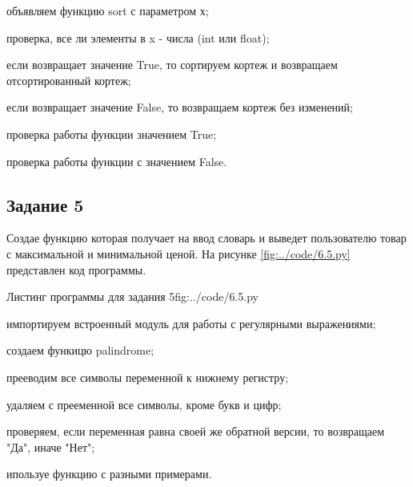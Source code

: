 \documentclass{vvsu}
\begin{document}
\begin{vvsu_list}
  \item объявляем функцию sort с параметром х;
  \item проверка, все ли элементы в x - числа (int или float);
  \item если возвращает значение True, то сортируем кортеж и возвращаем отсортированный кортеж;
  \item если возвращает значение False, то возвращаем кортеж без изменений;
  \item проверка работы функции значением True;
  \item проверка работы функции с значением False.
\end{vvsu_list}

\subsection{Задание 5}
  Создае функцию которая получает на ввод словарь и выведет пользователю товар с максимальной и минимальной ценой. На рисунке  \ref{fig:../code/6.5.py} представлен код программы.

\begin{vvsu_figure}{Листинг программы для задания 5}{fig:../code/6.5.py}
  \begin{minipage}{.75\textwidth}
    
  \end{minipage}
\end{vvsu_figure}

\begin{vvsu_list}
  \item импортируем встроенный модуль для работы с регулярными выражениями;
  \item создаем функицю palindrome;
  \item прееводим все символы переменной к нижнему регистру;
  \item удаляем с прееменной все символы, кроме букв и цифр;
  \item проверяем, если переменная равна своей же обратной версии, то возвращаем "Да", иначе "Нет";
  \item ипользуе функцию с разными примерами.
\end{vvsu_list}
\end{document}
